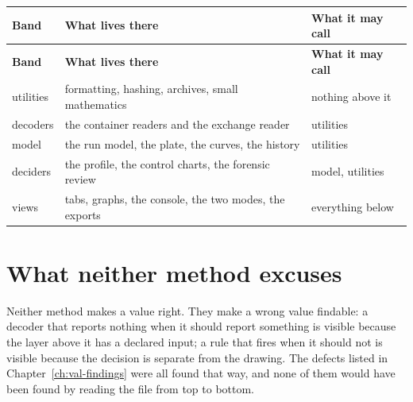 {\small
\begin{xltabular}{\linewidth}{|X|l|l|}
\toprule \textbf{Band} & \textbf{What lives there} & \textbf{What it may call} \\\midrule\endfirsthead
\toprule \textbf{Band} & \textbf{What lives there} & \textbf{What it may call} \\\midrule\endhead
utilities & formatting, hashing, archives, small mathematics & nothing above it \\
decoders & the container readers and the exchange reader & utilities \\
model & the run model, the plate, the curves, the history & utilities \\
deciders & the profile, the control charts, the forensic review & model, utilities \\
views & tabs, graphs, the console, the two modes, the exports & everything below \\
\bottomrule
\end{xltabular}}


\section{What neither method excuses}
Neither method makes a value right. They make a wrong value findable: a decoder
that reports nothing when it should report something is visible because the layer
above it has a declared input; a rule that fires when it should not is visible
because the decision is separate from the drawing. The defects listed in
Chapter~\ref{ch:val-findings} were all found that way, and none of them would have
been found by reading the file from top to bottom.

